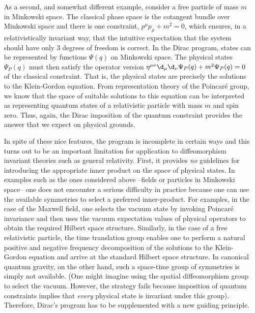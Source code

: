 As a second, and somewhat different example, consider a free particle
of mass $m$ in Minkowski space. The classical phase space is the cotangent
bundle over Minkowski space and there is one constraint, $p^\mu p_\mu +
m^2 =0$, which ensures, in a relativistically invariant way, that the
intuitive expectation that the system should have only 3 degrees of freedom
is correct. In the Dirac program, states can be represented by functions
$\Psi(q)$ on Minkowski space. The physical states $\Psi_P(q)$ must then
satisfy the operator version $\eta^{\mu\nu}\d_\mu \d_\nu \Psi_P(q)
+m^2 \Psi_P(q) = 0$ of the classical constraint. That is, the physical states
are precisely the solutions to the Klein-Gordon equation. From representation
theory of the Poincar\'e group, we know that the space of suitable solutions
to this equation can be interpreted as representing quantum states of a
relativistic particle with mass $m$ and spin zero. Thus, again, the
Dirac imposition of the quantum constraint provides the answer that we expect
on physical grounds.

In spite of these nice features, the program is incomplete in certain
ways and this turns out to be an important limitation for application to
diffeomorphism invariant theories such as general relativity. First,
it provides {\it no} guidelines for introducing the appropriate inner
product on the space of physical states. In examples such as the ones
considered above --fields or particles in Minkowski space-- one does not
encounter a serious difficulty in practice because one can use the
available symmetries to select a preferred inner-product. For examples,
in the case of the Maxwell field, one selects the vacuum state by invoking
Poincar\'e invariance and then uses the vacuum expectation values of
physical operators to obtain the required Hilbert space structure. Similarly,
in the case of a free relativistic particle, the time translation group
enables one to perform a natural positive and negative frequency
decomposition of the solutions to the Klein-Gordon equation and arrive at
the standard Hilbert space structure. In canonical quantum gravity, on the
other hand, such a space-time group of symmetries is simply not available.
(One might imagine using the spatial diffeomorphism group to select the
vacuum. However, the strategy fails because imposition of quantum
constraints implies that {\it every} physical state is invariant under this
group). Therefore, Dirac's program has to be supplemented with a new guiding
principle.

